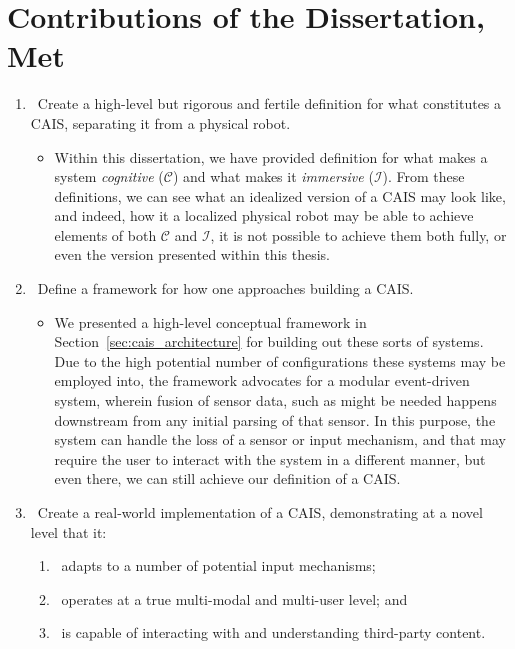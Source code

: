 \section{Contributions of the Dissertation, Met}

\begin{enumerate}
    \item \checkmark\ Create a high-level but rigorous and fertile definition for what
        constitutes a CAIS, separating it from a physical robot.

    \begin{itemize}
        \item[] Within this dissertation, we have provided definition for what makes a system
        \textit{cognitive} ($\mathcal{C}$) and what makes it \textit{immersive} ($\mathcal{I}$).
        From these definitions, we can see what an idealized version of a CAIS may look like,
        and indeed, how it a localized physical robot may be able to achieve elements of both
        $\mathcal{C}$ and $\mathcal{I}$, it is not possible to achieve them both fully, or even
        the version presented within this thesis.
    \end{itemize}
  
    \item \checkmark\ Define a framework for how one approaches building a CAIS.
    \begin{itemize}
        \item[] We presented a high-level conceptual framework in
        Section~\ref{sec:cais_architecture} for building out these sorts of systems. Due to the
        high potential number of configurations these systems may be employed into, the framework advocates for
        a modular event-driven system, wherein fusion of sensor data, such as might be needed
        happens downstream from any initial parsing of that sensor. In this purpose, the system
        can handle the loss of a sensor or input mechanism, and that may require the user to
        interact with the system in a different manner, but even there, we can still achieve our
        definition of a CAIS.
    \end{itemize}
    
    \item \checkmark\ Create a real-world implementation of a CAIS, demonstrating at a
  novel level that it:
        \begin{enumerate}
            \item \checkmark\ adapts to a number of potential input mechanisms;
            \item \checkmark\ operates at a true multi-modal and multi-user level; and
            \item \checkmark\ is capable of interacting with and understanding
              third-party content.
        \end{enumerate}
        

\end{enumerate}
